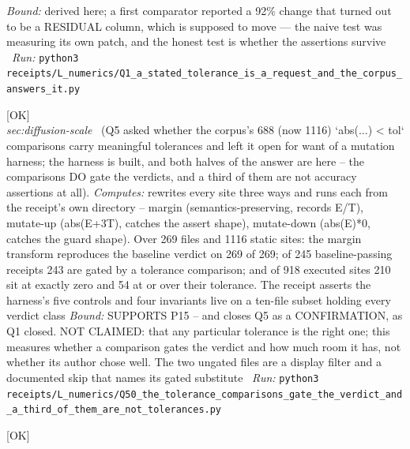 \begin{description}
 \emph{Bound:} derived here; a first comparator reported a 92\% change that turned out to be a RESIDUAL column, which is supposed to move --- the naive test was measuring its own patch, and the honest test is whether the assertions survive
\ \emph{Run:} \texttt{python3 receipts/L\_numerics/Q1\_a\_stated\_tolerance\_is\_a\_request\_and\_the\_corpus\_answers\_it.py}
\item[\label{rcpt:Q50_the_tolerance_comparisons_gate_the_verdict_and_a_third_of_them_are_not_tolerances}\textbf{}\quad\texttt{Q50\_the\_tolerance\_comparisons\_gate\_the\_verdict\_and\_a\_third\_of\_them\_are\_not\_tolerances}]\hfill\textsf{[OK]}\\
\textit{sec:diffusion-scale} \ (Q5 asked whether the corpus's 688 (now 1116) `abs(...) < tol` comparisons carry meaningful tolerances and left it open for want of a mutation harness; the harness is built, and both halves of the answer are here -- the comparisons DO gate the verdicts, and a third of them are not accuracy assertions at all). 
\emph{Computes:} rewrites every site three ways and runs each from the receipt's own directory -- margin (semantics-preserving, records E/T), mutate-up (abs(E+3T), catches the assert shape), mutate-down (abs(E)*0, catches the guard shape). Over 269 files and 1116 static sites: the margin transform reproduces the baseline verdict on 269 of 269; of 245 baseline-passing receipts 243 are gated by a tolerance comparison; and of 918 executed sites 210 sit at exactly zero and 54 at or over their tolerance. The receipt asserts the harness's five controls and four invariants live on a ten-file subset holding every verdict class
 \emph{Bound:} SUPPORTS P15 -- and closes Q5 as a CONFIRMATION, as Q1 closed. NOT CLAIMED: that any particular tolerance is the right one; this measures whether a comparison gates the verdict and how much room it has, not whether its author chose well. The two ungated files are a display filter and a documented skip that names its gated substitute
\ \emph{Run:} \texttt{python3 receipts/L\_numerics/Q50\_the\_tolerance\_comparisons\_gate\_the\_verdict\_and\_a\_third\_of\_them\_are\_not\_tolerances.py}
\item[\rcptlabel{P15_the_progenitor_vacuum_is_negligible_too}{P15R88}\textbf{P15R88}\quad\texttt{P15\_the\_progenitor\_vacuum\_is\_negligible\_too}]\hfill\textsf{[OK]}\\

\end{description}
